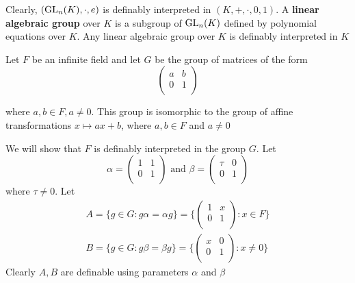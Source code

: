 \documentclass[11pt]{article}
\begin{document}
Clearly, \((\text{GL}_n(K),\cdot,e)\) is definably interpreted in \((K,+,\cdot,0,1)\).
A \textbf{linear algebraic group} over \(K\) is a subgroup of \(\text{GL}_n(K)\) defined by
polynomial equations over \(K\). Any linear algebraic group over \(K\) is
definably interpreted in \(K\)

Let \(F\) be an infinite field and let \(G\) be the group of matrices of the form 
\[
\begin{pmatrix}
 a & b \\
 0 & 1 \\
\end{pmatrix}
\]

where \(a,b\in F, a\neq 0\). This group is isomorphic to the group of affine
transformations \(x\mapsto ax+b\), where \(a,b\in F\) and \(a\neq 0\)

We will show that \(F\) is definably interpreted in the group \(G\). Let
\begin{equation*}
 \alpha=\begin{pmatrix}
        1&1\\
        0&1\\
        \end{pmatrix}\text{ and }
\beta=\begin{pmatrix}
\tau&0\\
0&1\\
      \end{pmatrix}
\end{equation*}
where \(\tau\neq 0\). Let
\begin{gather*}
A=\{g\in G:g\alpha=\alpha g\}=\{\begin{pmatrix}
1&x\\
0&1\\
                                \end{pmatrix}:x\in F\}\\
B=\{g\in G:g\beta=\beta g\}=\{\begin{pmatrix}
x&0\\
0&1\\
                                \end{pmatrix}:x\neq 0\}
\end{gather*}
Clearly \(A,B\) are definable using parameters \(\alpha\) and \(\beta\)
\end{document}

